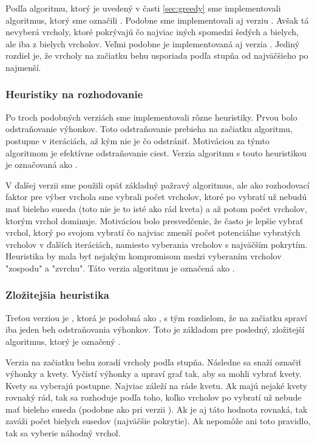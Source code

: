 Podľa algoritmu, ktorý je uvedený v časti \ref{sec:greedy} sme implementovali 
algoritmus, ktorý sme označili . Podobne sme implementovali aj 
verziu . Avšak tá nevyberá vrcholy, ktoré pokrývajú čo najviac 
iných spomedzi šedých a bielych, ale iba z bielych vrcholov. Veľmi podobne je 
implementovaná aj verzia . Jediný rozdiel je, že vrcholy na 
začiatku behu usporiada podľa stupňa od najväčšieho po najmenší.

\subsubsection{Heuristiky na rozhodovanie}

Po troch podobných verziách sme implementovali rôzne heuristiky. Prvou bolo 
odstraňovanie výhonkov. Toto odstraňovanie prebieha na začiatku 
algoritmu, postupne v iteráciách, až kým nie je čo odstrániť. Motiváciou za 
týmto algoritmom je efektívne odstraňovanie ciest. Verzia algoritmu s touto 
heuristikou je označovaná ako . 

V ďalšej verzii sme použili opäť základný pažravý algoritmus, ale ako 
rozhodovací faktor pre výber vrchola sme vybrali počet vrcholov, ktoré po 
vybratí už nebudú mať bieleho suseda (toto nie je to isté ako rád kveta) 
a až potom počet vrcholov, ktorým vrchol dominuje. Motiváciou bolo 
presvedčenie, že často je lepšie vybrať vrchol, ktorý po svojom vybratí čo 
najviac zmenší počet potenciálne vybratých vrcholov v ďalších iteráciách, 
namiesto vyberania vrcholov s najväčším pokrytím.
Heuristika by mala byť nejakým 
kompromisom medzi vyberaním vrcholov "zospodu" a "zvrchu". Táto verzia 
algoritmu je označená ako .

\subsubsection{Zložitejšia heuristika}

Treťou verziou je , ktorá je podobná ako , s tým 
rozdielom, že na začiatku spraví iba jeden beh odstraňovania výhonkov. Toto je 
základom pre posledný, zložitejší algoritmus, ktorý je označený . 

Verzia  na začiatku behu zoradí vrcholy podľa stupňa. Následne sa 
snaží označiť výhonky a kvety. Vyčistí výhonky a upraví graf tak, aby sa mohli 
vybrať kvety. Kvety sa vyberajú postupne. Najviac záleží na ráde kvetu. Ak majú 
nejaké kvety rovnaký rád, tak sa rozhoduje podľa toho, koľko vrcholov po 
vybratí už nebude mať bieleho suseda (podobne ako pri verzii ). 
Ak je aj táto hodnota rovnaká, tak zaváži počet bielych susedov (najväčšie 
pokrytie). Ak nepomôže ani toto pravidlo, tak sa vyberie náhodný vrchol.

